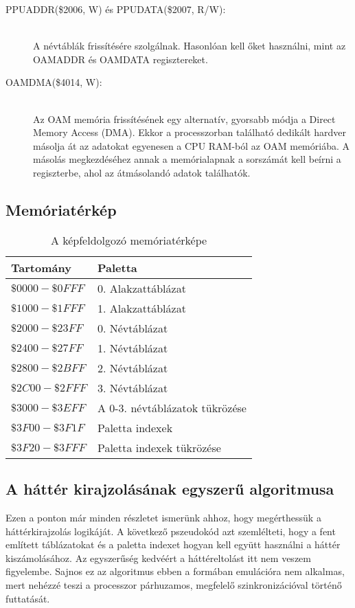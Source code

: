 \begin{description}
	\item[PPUADDR(\$2006, W) és PPUDATA(\$2007, R/W):] \hfill \\
	A névtáblák frissítésére szolgálnak. Hasonlóan kell őket használni, mint az OAMADDR és OAMDATA regisztereket.
	\item[OAMDMA(\$4014, W):] \hfill \\
	Az OAM memória frissítésének egy alternatív, gyorsabb módja a Direct Memory Access (DMA). Ekkor a processzorban található dedikált hardver másolja át az adatokat egyenesen a CPU RAM-ból az OAM memóriába. A másolás megkezdéséhez annak a memórialapnak a sorszámát kell beírni a regiszterbe, ahol az átmásolandó adatok találhatók.
\end{description}

\subsection{Memóriatérkép \cite{ppuref}}

\begin{table}[H]
	\centering
	\begin{tabular}{ | l | l | }
		\hline
		Tartomány & Paletta \\
		\hline			
		$ \$0000 - \$0FFF $ & 0. Alakzattáblázat \\
		$ \$1000 - \$1FFF $ & 1. Alakzattáblázat \\
		$ \$2000 - \$23FF $ & 0. Névtáblázat \\
		$ \$2400 - \$27FF $ & 1. Névtáblázat \\
		$ \$2800 - \$2BFF $ & 2. Névtáblázat \\
		$ \$2C00 - \$2FFF $ & 3. Névtáblázat \\
		$ \$3000 - \$3EFF $ & A 0-3. névtáblázatok tükrözése \\
		$ \$3F00 - \$3F1F $ & Paletta indexek \\
		$ \$3F20 - \$3FFF $ & Paletta indexek tükrözése \\
		\hline
	\end{tabular}
	\caption{A képfeldolgozó memóriatérképe}
	\label{fig:ppumemmap}
\end{table}

\subsection{A háttér kirajzolásának egyszerű algoritmusa}

Ezen a ponton már minden részletet ismerünk ahhoz, hogy megérthessük a háttérkirajzolás logikáját. A következő pszeudokód azt szemlélteti, hogy a fent említett táblázatokat és a paletta indexet hogyan kell együtt használni a háttér kiszámolásához. Az egyszerűség kedvéért a háttéreltolást itt nem veszem figyelembe. Sajnos ez az algoritmus ebben a formában emulációra nem alkalmas, mert nehézzé teszi a processzor párhuzamos, megfelelő szinkronizációval történő futtatását.
\vspace{0.3cm}

